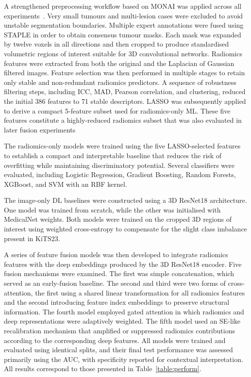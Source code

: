 A strengthened preprocessing workflow based on MONAI was applied across all experiments~\cite{cardoso2022monai}. Very small tumours and multi-lesion cases were excluded to avoid unstable segmentation boundaries. Multiple expert annotations were fused using STAPLE in order to obtain consensus tumour masks. Each mask was expanded by twelve voxels in all directions and then cropped to produce standardised volumetric regions of interest suitable for 3D convolutional networks. Radiomics features were extracted from both the original and the Laplacian of Gaussian filtered images. Feature selection was then performed in multiple stages to retain only stable and non-redundant radiomics predictors. A sequence of robustness filtering steps, including ICC, MAD, Pearson correlation, and clustering, reduced the initial 386 features to 71 stable descriptors. LASSO was subsequently applied to derive a compact 5-feature subset used for radiomics-only ML. These five features constitute a highly-reduced radiomics subset that was also evaluated in later fusion experiments

The radiomics-only models were trained using the five LASSO-selected features to establish a compact and interpretable baseline that reduces the risk of overfitting while maintaining discriminatory potential. Several classifiers were evaluated, including Logistic Regression, Gradient Boosting, Random Forests, XGBoost, and SVM with an RBF kernel.

The image-only DL baselines were constructed using a 3D ResNet18 architecture. One model was trained from scratch, while the other was initialised with MedicalNet weights. Both models were trained on the cropped 3D regions of interest using weighted cross-entropy to compensate for the slight class imbalance present in KiTS23.

A series of feature fusion models was then developed to integrate radiomics features with the deep embeddings produced by the 3D ResNet18 encoder. Five fusion mechanisms were examined. The first was simple concatenation, which served as an early-fusion baseline. The second and third were two forms of cross-attention, the first using a shared linear transformation for all radiomics features and the second introducing feature index embeddings to preserve structural information. The fourth model employed gated attention in which radiomics and deep representations were adaptively weighted. The fifth model used an SE-like recalibration mechanism that amplified or suppressed radiomics contributions according to the corresponding deep features. All models were trained and evaluated using identical splits, and their final test performance was assessed primarily using the AUC, with specificity reported for contextual interpretation. All results correspond to those presented in Table~\ref{table:perform}.

